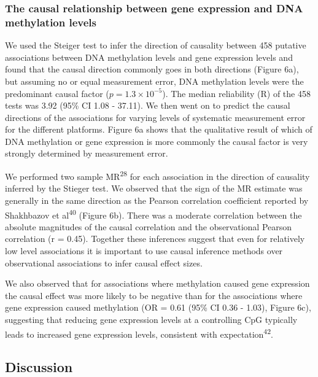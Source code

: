 \documentclass[]{article}
\begin{document}
\subsubsection{The causal relationship between gene expression and DNA
methylation
levels}\label{the-causal-relationship-between-gene-expression-and-dna-methylation-levels}

We used the Steiger test to infer the direction of causality between 458
putative associations between DNA methylation levels and gene expression
levels and found that the causal direction commonly goes in both
directions (Figure 6a), but assuming no or equal measurement error, DNA
methylation levels were the predominant causal factor
(\(p = 1.3\times 10^{-5}\)). The median reliability (R) of the 458 tests
was 3.92 (95\% CI 1.08 - 37.11). We then went on to predict the causal
directions of the associations for varying levels of systematic
measurement error for the different platforms. Figure 6a shows that the
qualitative result of which of DNA methylation or gene expression is
more commonly the causal factor is very strongly determined by
measurement error.

We performed two sample MR\textsuperscript{28} for each association in
the direction of causality inferred by the Stieger test. We observed
that the sign of the MR estimate was generally in the same direction as
the Pearson correlation coefficient reported by Shakhbazov et
al\textsuperscript{40} (Figure 6b). There was a moderate correlation
between the absolute magnitudes of the causal correlation and the
observational Pearson correlation (r = 0.45). Together these inferences
suggest that even for relatively low level associations it is important
to use causal inference methods over observational associations to infer
causal effect sizes.

We also observed that for associations where methylation caused gene
expression the causal effect was more likely to be negative than for the
associations where gene expression caused methylation (OR = 0.61 (95\%
CI 0.36 - 1.03), Figure 6c), suggesting that reducing gene expression
levels at a controlling CpG typically leads to increased gene expression
levels, consistent with expectation\textsuperscript{42}.

\subsection{Discussion}\label{discussion}
\end{document}
